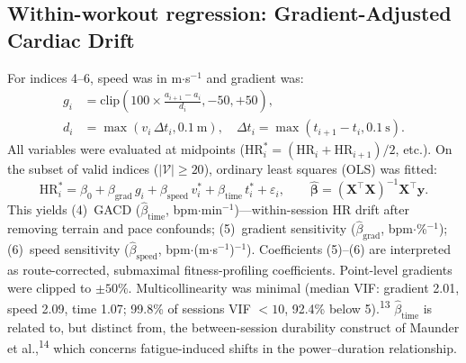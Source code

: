 \documentclass[12pt]{article}
\begin{document}
\subsection{Within-workout regression: Gradient-Adjusted Cardiac Drift}
For indices 4--6, speed was in m$\cdot$s$^{-1}$ and gradient was:
\begin{align*}
  g_i &= \mathrm{clip}\!\left(100\times\frac{a_{i+1}-a_i}{d_i},-50,+50\right),\\
  d_i &= \max(v_i\,\Delta t_i, 0.1~\mathrm{m}),\quad
  \Delta t_i=\max(t_{i+1}-t_i,0.1~\mathrm{s}).
\end{align*}
All variables were evaluated at midpoints ($\mathrm{HR}^*_i=(\mathrm{HR}_i+
\mathrm{HR}_{i+1})/2$, etc.). On the subset of valid indices ($|\mathcal{V}|
\geq 20$), ordinary least squares (OLS) was fitted:
\begin{equation}
  \mathrm{HR}^*_i = \beta_0 + \beta_{\mathrm{grad}}\,g_i
  + \beta_{\mathrm{speed}}\,v^*_i + \beta_{\mathrm{time}}\,t^*_i
  + \varepsilon_i,\qquad
  \hat{\bm\beta}=(\mathbf X^\top\mathbf X)^{-1}\mathbf X^\top\mathbf y.
  \label{eq:gacd}
\end{equation}
This yields (4)~GACD ($\hat\beta_{\mathrm{time}}$,
bpm$\cdot$min$^{-1}$)---within-session HR drift after removing terrain and
pace confounds; (5)~gradient sensitivity ($\hat\beta_{\mathrm{grad}}$,
bpm$\cdot$\%$^{-1}$); (6)~speed sensitivity ($\hat\beta_{\mathrm{speed}}$,
bpm$\cdot$(m$\cdot$s$^{-1}$)$^{-1}$). Coefficients (5)--(6) are interpreted
as route-corrected, submaximal fitness-profiling coefficients.
Point-level gradients were clipped to $\pm 50\%$. Multicollinearity was
minimal (median VIF: gradient 2.01, speed 2.09, time 1.07; 99.8\% of
sessions VIF $<10$, 92.4\% below 5).\textsuperscript{13} $\hat\beta_{\mathrm{time}}$
is related to, but distinct from, the between-session durability construct
of Maunder et al.,\textsuperscript{14} which concerns fatigue-induced
shifts in the power--duration relationship.
\end{document}
